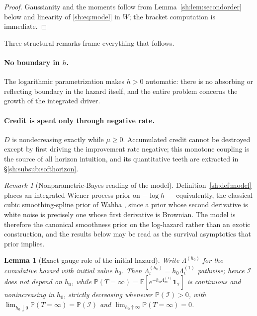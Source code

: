 \documentclass[11pt]{article}
\numberwithin{equation}{section}
\theoremstyle{plain}
\newtheorem{lemma}[theorem]{Lemma}
\theoremstyle{definition}
\theoremstyle{remark}
\newtheorem{remark}[theorem]{Remark}
\newcommand{\E}{\mathbb{E}}
\newcommand{\PP}{\mathbb{P}}
\newcommand{\one}{\mathbf{1}}
\newcommand{\Imm}{\mathcal{I}}
\begin{document}
\begin{proof}
Gaussianity and the moments follow from
Lemma~\ref{sh:lem:secondorder} below and linearity of
\eqref{sh:eq:model} in $W$; the bracket computation is immediate.
\end{proof}

Three structural remarks frame everything that follows.

\paragraph{No boundary in $h$.}\label{sh:rem:noboundary}
The logarithmic parametrization makes $h>0$ automatic: there is no absorbing
or reflecting boundary in the hazard itself, and the entire problem concerns
the growth of the integrated driver.

\paragraph{Credit is spent only through negative rate.}\label{sh:rem:monot}
$D$ is nondecreasing exactly while $\mu\ge0$. Accumulated credit cannot be
destroyed except by first driving the improvement rate negative; this
monotone coupling is the source of all horizon intuition, and its
quantitative teeth are extracted in \S\ref{sh:subsub:softhorizon}.

\begin{remark}[Nonparametric-Bayes reading of the model]\label{sh:rem:iwp}
Definition~\ref{sh:def:model} places an integrated Wiener process prior on
$-\log h$ --- equivalently, the classical cubic smoothing-spline prior of
Wahba \cite{Wah78}, since a prior whose second derivative is white noise
is precisely one whose first derivative is Brownian. The model is
therefore the canonical smoothness prior on the log-hazard rather than an
exotic construction, and the results below may be read as the survival
asymptotics that prior implies.
\end{remark}

\begin{lemma}[Exact gauge role of the initial hazard]\label{sh:lem:hgauge}
Write $\Lambda^{(h_0)}$ for the cumulative hazard with initial value $h_0$.
Then $\Lambda^{(h_0)}_t=h_0\Lambda^{(1)}_t$ pathwise; hence $\Imm$ does not
depend on $h_0$, while
$\PP(T=\infty)=\E[e^{-h_0\Lambda^{(1)}_\infty}\one_\Imm]$ is continuous and
nonincreasing in $h_0$, strictly decreasing whenever $\PP(\Imm)>0$, with
$\lim_{h_0\downarrow0}\PP(T=\infty)=\PP(\Imm)$ and
$\lim_{h_0\uparrow\infty}\PP(T=\infty)=0$.
\end{lemma}
\end{document}
